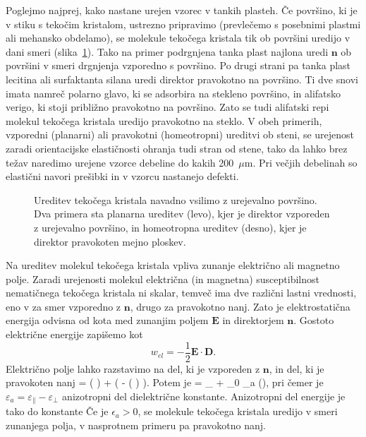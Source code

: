 Poglejmo najprej, kako nastane urejen vzorec v tankih plasteh. Če površino,
ki je v stiku s tekočim kristalom, ustrezno pripravimo (prevlečemo s posebnimi 
plastmi ali mehansko obdelamo), se molekule tekočega kristala tik ob površini uredijo
v dani smeri (slika~\ref{s7.20a}).
Tako na primer podrgnjena tanka plast najlona uredi $\mathbf{n}$ ob površini v smeri
drgnjenja vzporedno s površino. Po drugi strani pa tanka plast lecitina ali 
surfaktanta silana uredi direktor pravokotno na površino. Ti dve snovi imata namreč
polarno glavo, ki se adsorbira na stekleno površino, in alifatsko verigo, 
ki stoji približno pravokotno na površino. Zato se tudi alifatski repi molekul
tekočega kristala uredijo pravokotno na steklo. V obeh primerih, 
vzporedni (planarni) ali pravokotni (homeotropni) ureditvi ob steni, 
se urejenost zaradi orientacijske elastičnosti
ohranja tudi stran od stene, tako da lahko brez težav naredimo urejene
vzorce debeline do kakih 200~$\mu$m. Pri večjih debelinah so elastični
navori prešibki in v vzorcu nastanejo defekti.
\begin{figure}[h]
\centering
\def\svgwidth{50truemm} 
\qquad
\def\svgwidth{54truemm} 

\caption{Ureditev tekočega kristala navadno vsilimo z urejevalno površino. Dva primera
sta planarna ureditev (levo), kjer je direktor vzporeden z urejevalno površino, in 
homeotropna ureditev (desno), kjer je direktor pravokoten mejno ploskev.}
\label{s7.20a}
\end{figure}
 
Na ureditev molekul tekočega kristala vpliva zunanje električno ali magnetno polje.
Zaradi urejenosti molekul električna (in magnetna) susceptibilnost nematičnega tekočega
kristala ni skalar, temveč ima dve različni lastni vrednosti,
eno v za smer vzporedno z $\mathbf{n}$, drugo za pravokotno nanj. Zato je
elektrostatična energija odvisna od kota med zunanjim poljem $\mathbf{E}$
in direktorjem $\mathbf{n}$. Gostoto električne energije 
zapišemo kot 
\begin{equation}
w_{el}=-\frac{1}{2}\mathbf{E}\cdot \mathbf{D}.
\label{lcwe}
\end{equation}
Električno polje lahko razstavimo na del, ki je vzporeden z $\mathbf{n}$, in del, ki je
pravokoten nanj
\beq
{} = ( \cdot {})  + \left(  - 
( \cdot {})  \right).
\eeq
Potem je 
\beq
{} = \varepsilon \varepsilon_\bot {} + \varepsilon_0 \varepsilon_a
(\cdot{}),
\label{7.56a}
\eeq
pri čemer je $\varepsilon_a = \varepsilon_\parallel - \varepsilon_\bot$ anizotropni
del dielektrične konstante. Anizotropni del energije je tako do konstante
Če je $\epsilon_{a}>0$, se molekule tekočega kristala uredijo v smeri 
zunanjega polja, v nasprotnem primeru pa pravokotno nanj.

